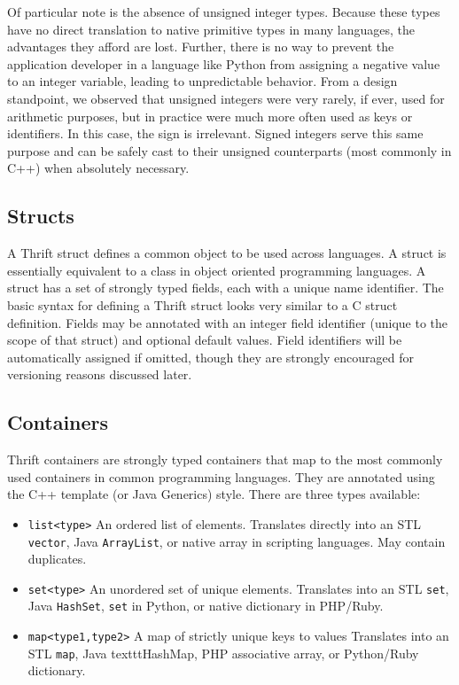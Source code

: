 \documentclass[nocopyrightspace,blockstyle]{sigplanconf}
\begin{document}
Of particular note is the absence of unsigned integer types. Because these
types have no direct translation to native primitive types in many languages,
the advantages they afford are lost. Further, there is no way to prevent the
application developer in a language like Python from assigning a negative value
to an integer variable, leading to unpredictable behavior. From a design
standpoint, we observed that unsigned integers were very rarely, if ever, used
for arithmetic purposes, but in practice were much more often used as keys or
identifiers. In this case, the sign is irrelevant. Signed integers serve this
same purpose and can be safely cast to their unsigned counterparts (most
commonly in C++) when absolutely necessary.

\subsection{Structs}

A Thrift struct defines a common object to be used across languages. A struct
is essentially equivalent to a class in object oriented programming
languages. A struct has a set of strongly typed fields, each with a unique
name identifier. The basic syntax for defining a Thrift struct looks very
similar to a C struct definition. Fields may be annotated with an integer field
identifier (unique to the scope of that struct) and optional default values.
Field identifiers will be automatically assigned if omitted, though they are
strongly encouraged for versioning reasons discussed later.

\subsection{Containers}

Thrift containers are strongly typed containers that map to the most commonly
used containers in common programming languages. They are annotated using
the C++ template (or Java Generics) style. There are three types available:
\begin{itemize}
\item \texttt{list<type>} An ordered list of elements. Translates directly into
an STL \texttt{vector}, Java \texttt{ArrayList}, or native array in scripting languages. May
contain duplicates.
\item \texttt{set<type>} An unordered set of unique elements. Translates into
an STL \texttt{set}, Java \texttt{HashSet}, \texttt{set} in Python, or native
dictionary in PHP/Ruby. 
\item \texttt{map<type1,type2>} A map of strictly unique keys to values
Translates into an STL \texttt{map}, Java texttt{HashMap}, PHP associative
array, or Python/Ruby dictionary.
\end{itemize}
\end{document}
